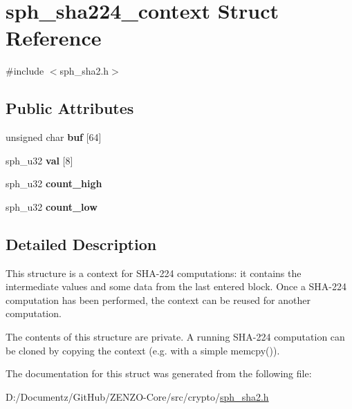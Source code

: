 \hypertarget{structsph__sha224__context}{}\section{sph\+\_\+sha224\+\_\+context Struct Reference}
\label{structsph__sha224__context}


{\ttfamily \#include $<$sph\+\_\+sha2.\+h$>$}

\subsection*{Public Attributes}
\begin{DoxyCompactItemize}
\item 
\mbox{\label{structsph__sha224__context_a0dd01410525352246ebf8379a7106551}} 
unsigned char {\bfseries buf} \mbox{[}64\mbox{]}
\item 
\mbox{\label{structsph__sha224__context_ad694208fa46b7032e0cf0ef62752cc39}} 
sph\+\_\+u32 {\bfseries val} \mbox{[}8\mbox{]}
\item 
\mbox{\label{structsph__sha224__context_ad35bd273d743e0d396da73befaad56c9}} 
sph\+\_\+u32 {\bfseries count\+\_\+high}
\item 
\mbox{\label{structsph__sha224__context_ac99a110564f7cc60ddd51212a529e34a}} 
sph\+\_\+u32 {\bfseries count\+\_\+low}
\end{DoxyCompactItemize}


\subsection{Detailed Description}
This structure is a context for S\+H\+A-\/224 computations\+: it contains the intermediate values and some data from the last entered block. Once a S\+H\+A-\/224 computation has been performed, the context can be reused for another computation.

The contents of this structure are private. A running S\+H\+A-\/224 computation can be cloned by copying the context (e.\+g. with a simple {\ttfamily memcpy()}). 

The documentation for this struct was generated from the following file\+:\begin{DoxyCompactItemize}
\item 
D\+:/\+Documentz/\+Git\+Hub/\+Z\+E\+N\+Z\+O-\/\+Core/src/crypto/\mbox{\hyperlink{sph__sha2_8h}{sph\+\_\+sha2.\+h}}\end{DoxyCompactItemize}
